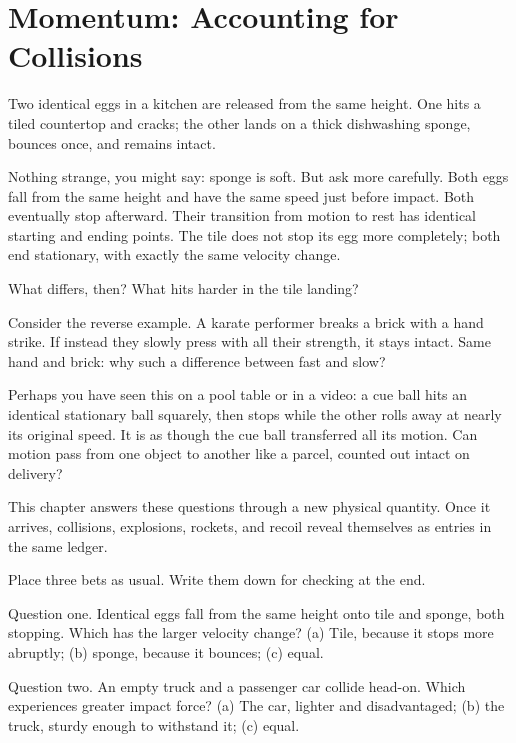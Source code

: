 \chapter{Momentum: Accounting for Collisions}


\begin{mainline}
Two identical eggs in a kitchen are released from the same height. One hits a tiled countertop and cracks; the other lands on a thick dishwashing sponge, bounces once, and remains intact.

Nothing strange, you might say: sponge is soft. But ask more carefully. Both eggs fall from the same height and have the same speed just before impact. Both eventually stop afterward. Their transition from motion to rest has identical starting and ending points. The tile does not stop its egg more completely; both end stationary, with exactly the same velocity change.

What differs, then? What hits harder in the tile landing?

Consider the reverse example. A karate performer breaks a brick with a hand strike. If instead they slowly press with all their strength, it stays intact. Same hand and brick: why such a difference between fast and slow?

Perhaps you have seen this on a pool table or in a video: a cue ball hits an identical stationary ball squarely, then stops while the other rolls away at nearly its original speed. It is as though the cue ball transferred all its motion. Can motion pass from one object to another like a parcel, counted out intact on delivery?

This chapter answers these questions through a new physical quantity. Once it arrives, collisions, explosions, rockets, and recoil reveal themselves as entries in the same ledger.
\end{mainline}


Place three bets as usual. Write them down for checking at the end.

Question one. Identical eggs fall from the same height onto tile and sponge, both stopping. Which has the larger velocity change? (a) Tile, because it stops more abruptly; (b) sponge, because it bounces; (c) equal.

Question two. An empty truck and a passenger car collide head-on. Which experiences greater impact force? (a) The car, lighter and disadvantaged; (b) the truck, sturdy enough to withstand it; (c) equal.

